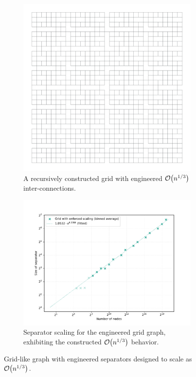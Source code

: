\begin{figure}[tbhp]
	\centering
	\begin{subfigure}{0.35\linewidth}
		\centering
		\includegraphics[width=\linewidth]{graphics/cbrt_grid.png}
		\caption{A recursively constructed grid with engineered \(\mathcal{O}\!\left(n^{1/3}\right)\) inter-connections.}
		\label{fig:engineered_grid_structure_viz}
	\end{subfigure}
	\hfill
	\begin{subfigure}{0.55\linewidth}
		\centering
		\includegraphics[width=\linewidth]{graphics/cbrt_grid_sep_scaling.pdf}
		\caption{Separator scaling for the engineered grid graph, exhibiting the constructed \(\mathcal{O}\!\left(n^{1/3}\right)\) behavior.}
		\label{fig:engineered_grid_sep_plot}
	\end{subfigure}
	\caption{Grid-like graph with engineered separators designed to scale as \(\mathcal{O}\!\left(n^{1/3}\right)\).}
	\label{fig:engineered_grid_sep}
\end{figure}
